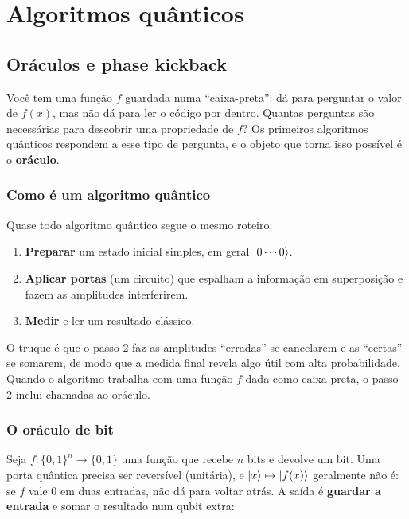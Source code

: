 \providecommand{\tightlist}{\setlength{\itemsep}{0pt}\setlength{\parskip}{0pt}}
\newpage
\section{Algoritmos quânticos}
\subsection{Oráculos e phase kickback}
Você tem uma função \(f\) guardada numa ``caixa-preta'': dá para perguntar o valor de \(f(x)\), mas não dá para ler o código por dentro. Quantas perguntas são necessárias para descobrir uma propriedade de \(f\)? Os primeiros algoritmos quânticos respondem a esse tipo de pergunta, e o objeto que torna isso possível é o \textbf{oráculo}.

\subsubsection{Como é um algoritmo quântico}\label{como-uxe9-um-algoritmo-quuxe2ntico}

Quase todo algoritmo quântico segue o mesmo roteiro:

\begin{enumerate}
\def\labelenumi{\arabic{enumi}.}
\tightlist
\item
  \textbf{Preparar} um estado inicial simples, em geral \(\left|{0\cdots0}\right>\).
\item
  \textbf{Aplicar portas} (um circuito) que espalham a informação em superposição e fazem as amplitudes interferirem.
\item
  \textbf{Medir} e ler um resultado clássico.
\end{enumerate}

O truque é que o passo 2 faz as amplitudes ``erradas'' se cancelarem e as ``certas'' se somarem, de modo que a medida final revela algo útil com alta probabilidade. Quando o algoritmo trabalha com uma função \(f\) dada como caixa-preta, o passo 2 inclui chamadas ao oráculo.

\subsubsection{O oráculo de bit}\label{o-oruxe1culo-de-bit}

Seja \(f:\{0,1\}^n \to \{0,1\}\) uma função que recebe \(n\) bits e devolve um bit. Uma porta quântica precisa ser reversível (unitária), e \(\left|{x}\right>\mapsto\left|{f(x)}\right>\) geralmente não é: se \(f\) vale \(0\) em duas entradas, não dá para voltar atrás. A saída é \textbf{guardar a entrada} e somar o resultado num qubit extra:


